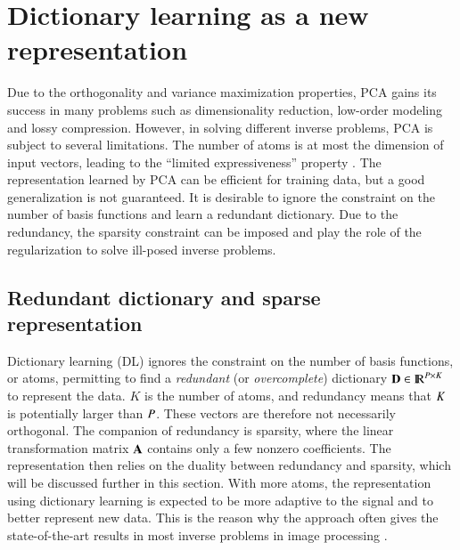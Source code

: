 \section{Dictionary learning as a new representation}
Due to the orthogonality and variance maximization properties, PCA gains its success in many problems such as dimensionality reduction, low-order modeling and lossy compression. However, in solving different inverse problems, PCA is subject to several limitations. The number of atoms is at most the dimension of input vectors, leading to the ``limited expressiveness'' property \citep{tovsic2011dictionary}. The representation learned by PCA can be efficient for training data, but a good generalization is not guaranteed. It is desirable to ignore the constraint on the number of basis functions and learn a redundant dictionary. Due to the redundancy, the sparsity constraint can be imposed and play the role of the regularization to solve ill-posed inverse problems.

\subsection{Redundant dictionary and sparse representation}
Dictionary learning (DL) ignores the constraint on the number of basis functions, or atoms, permitting to find a \textit{redundant} (or \textit{overcomplete}) dictionary $ \mathbf{D} \in {\rm I\!R}^{P \times K} $ to represent the data. $ K $ is the number of atoms, and redundancy means that $ K $ is potentially larger than $ P $. These vectors are therefore not necessarily orthogonal. The companion of redundancy is sparsity, where the linear transformation matrix $ \mathbf{A} $ contains only a few nonzero coefficients. The representation then relies on the duality between redundancy and sparsity, which will be discussed further in this section. With more atoms, the representation using dictionary learning is expected to be more adaptive to the signal and to better represent new data. This is the reason why the approach often gives the state-of-the-art results in most inverse problems in image processing \citep{elad2010on,yang2010image}.

